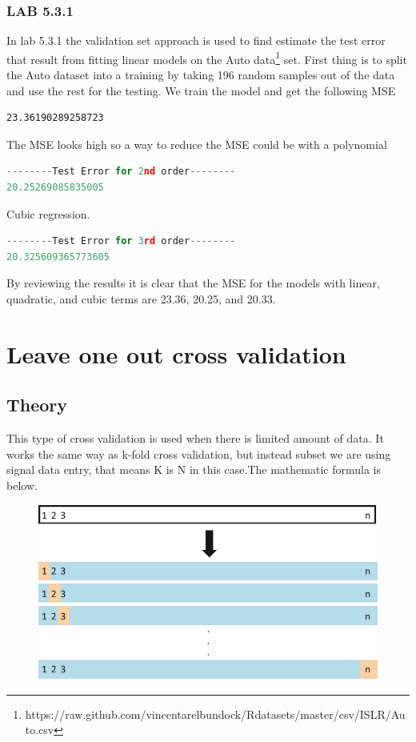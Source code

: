 \subsubsection*{LAB 5.3.1}%
In lab 5.3.1 the validation set approach is used to find estimate the test error that result from fitting linear models on the Auto data\footnote{https://raw.github.com/vincentarelbundock/Rdatasets/master/csv/ISLR/Auto.csv} set. First thing is to split the Auto dataset into a training by taking 196 random samples out of the data and use the rest for the testing. We train the model and get the following MSE
\begin{lstlisting}
23.36190289258723
\end{lstlisting}
The MSE looks high so a way to reduce the MSE could be with a polynomial 
\begin{lstlisting}[language=Python]
--------Test Error for 2nd order--------
20.25269085835005
\end{lstlisting}
Cubic regression.
\begin{lstlisting}[language=Python]
--------Test Error for 3rd order--------
20.325609365773605
\end{lstlisting}
By reviewing the results it is clear that the MSE for the models with linear, quadratic, and cubic terms are 23.36, 20.25, and 20.33.

\section {Leave one out cross validation}
\subsection{Theory}
This type of cross validation is used when there is limited amount of data. It works the same way as k-fold cross validation, but instead subset we are using signal data entry, that means K is N in this case.The mathematic formula is below. 

\begin{figure}[H]
	\centering
	\includegraphics[width=0.5\linewidth]{crossValidation/LOOCV}
	\caption{}
	\label{fig:loocv}
\end{figure}


